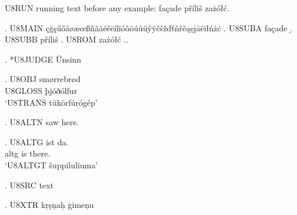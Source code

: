 

U8RUN running text before any example: façade příliš zażółć.

\ex. U8MAIN çğşűőåøæœßñãäéêëíîïóôöúûüýÿčšžďťňřěąęįāēīłńżċ
\a. U8SUBA façade
\b. U8SUBB příliš
\a. U8ROM zażółć
\z.\z.

\ex. *U8JUDGE Ünsinn

\exg. U8OBJ smørrebrød\\ U8GLOSS þjóðólfur\\
\glt `U8TRANS tükörfúrógép'

\ex. U8ALTN saw  here.

\exg. U8ALTG  ist da.\\
      altg  is there.\\
\glt `U8ALTGT šuppiluliuma'

\ex. U8SRC text 

\ex. U8XTR kṛṣṇaḥ ģimeņu

